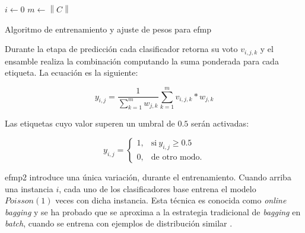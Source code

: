 \begin{center}
	\begin{algorithm}[H]
		\label{alg:entrenamiento_efmp}
		\SetAlgoLined
		\DontPrintSemicolon
		$i \gets 0$ \;
		$m \gets \left\|C\right\|$ \;
		\caption{Algoritmo de entrenamiento y ajuste de pesos para \acrfull{efmp}}
	\end{algorithm}
\end{center}

Durante la etapa de predicción cada clasificador retorna su voto $v_{i,j,k}$ y
el ensamble realiza la combinación computando la suma ponderada para cada
etiqueta. La ecuación es la siguiente:

\begin{equation}
	y_{i,j} = \frac{1}{\sum_{k=1}^{m} w_{j,k}} \sum_{k=1}^{m} v_{i,j,k} *
	w_{j,k}
\end{equation}

Las etiquetas cuyo valor superen un umbral de $0.5$ serán activadas:

\begin{equation}
	y_{i,j} =
	\begin{cases}
		1, & \text{si}\ y_{i,j} \geq 0.5 \\
		0, & \text{de otro modo.}
	\end{cases}
\end{equation}

\acrshort{efmp2} introduce una única variación, durante el entrenamiento. Cuando
arriba una instancia $i$, cada uno de los clasificadores base entrena el modelo
$Poisson(1)$ veces con dicha instancia. Esta técnica es conocida como
\textit{online bagging} y se ha probado que se aproxima a la estrategia
tradicional de \textit{bagging} en \textit{batch}, cuando se entrena con
ejemplos de distribución similar \cite{oza_online_2005}.


